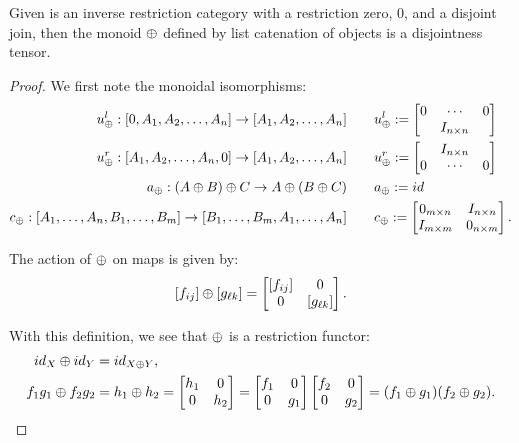 \begin{lemma}\label{lem:imat_is_disjoint_tensor_category}
  Given \X is an inverse restriction category with a restriction zero, $0$, and a disjoint join,
  then the monoid $\oplus$ defined by list catenation of objects is a disjointness tensor.
\end{lemma}
\begin{proof}
  We first note the monoidal isomorphisms:
  \begin{align*}
    u_{\oplus}^l : [0,A_1,A_2,\ldots,A_n] \to [A_1,A_2,\ldots,A_n] \qquad& u_{\oplus}^l :=
    \begin{bmatrix}
      0&\cdots&0 \\
      & I_{n\times n}
    \end{bmatrix}\\
    u_{\oplus}^r : [A_1,A_2,\ldots,A_n,0] \to [A_1,A_2,\ldots,A_n] \qquad & u_{\oplus}^r :=
    \begin{bmatrix}
      & I_{n\times n} \\
      0&\cdots&0
    \end{bmatrix} \\
    a_{\oplus} : (A\oplus B)\oplus C \to A\oplus (B\oplus C) \qquad &a_{\oplus} := id \\
    c_{\oplus} : [A_1,\ldots,A_n,B_1,\ldots,B_m] \to [B_1,\ldots,B_m,A_1,\ldots,A_n]  \qquad &
      c_{\oplus} := \begin{bmatrix}
                      0_{m\times n} & I_{n\times n} \\
                      I_{m\times m} & 0_{n\times m}
                \end{bmatrix}.
  \end{align*}

  The action of $\oplus$ on maps is given by:
  \[
    [f_{ij}]\oplus [g_{\ell k}] = \begin{bmatrix}
      [f_{ij}] & 0 \\
      0 & [g_{\ell k}]
      \end{bmatrix}.
  \]

  With this definition, we see that $\oplus$ is a restriction functor:
  \begin{align*}
    id_X \oplus id_Y &= id_{X\oplus Y}, \\
    f_1 g_1 \oplus f_2 g_2 &= h_1 \oplus h_2 =
    \begin{bmatrix}
      h_1 & 0 \\ 0 & h_2
    \end{bmatrix} =
    \begin{bmatrix}
      f_1 & 0 \\ 0 & g_1
    \end{bmatrix}
    \begin{bmatrix}
      f_2 & 0 \\ 0 & g_2
    \end{bmatrix} = (f_1 \oplus g_1) (f_2 \oplus g_2).
  \end{align*}


\end{proof}
